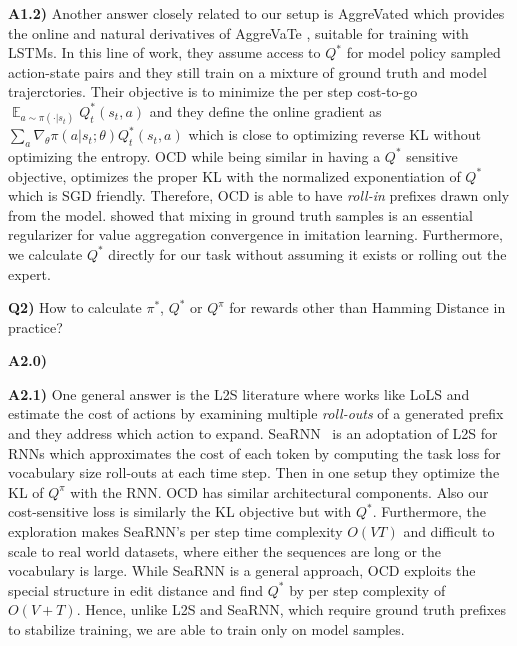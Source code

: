 {\textbf{A1.2)} Another answer closely related to our setup is AggreVated \citep{sun2017deeply} which provides the online and natural derivatives of AggreVaTe \citep{ross2014reinforcement}, suitable for training with LSTMs. In this line of work, they assume access to $Q^*$ for model policy sampled action-state pairs and they still train on a mixture of ground truth and model trajerctories. Their objective is to minimize the per step cost-to-go $\mathop{\mathbb{E}}_{a \sim \pi(\cdot | s_t)}Q_t^*(s_t,a)$ and they define the online gradient as $\sum_{a}\nabla_{\theta}\pi(a|s_t;\theta) Q_t^*(s_t, a)$ which is close to optimizing reverse KL without optimizing the entropy. OCD while being similar in having a  $Q^*$ sensitive objective, optimizes the proper KL with the normalized exponentiation of $Q^*$ which is SGD friendly. Therefore, OCD is able
to have {\em roll-in} prefixes drawn only from the model. \cite{cheng2018convergence} showed that
mixing in ground truth samples is an essential regularizer for value
aggregation convergence in imitation learning. Furthermore, we calculate $Q^*$ directly for our task without assuming it exists or rolling out the expert. 

\textbf{Q2)} How to calculate $\pi^*$, $Q^*$ or $Q^\pi$ for rewards other than Hamming Distance in practice?

\textbf{A2.0)} 

\textbf{A2.1)} One general answer is the L2S \citep{l2s2005}
literature where works like LoLS \citep{chang2015learning} and \cite{goodman2016noise}
estimate the cost of actions by examining
multiple {\em roll-outs} of a generated
prefix and they address which action to expand. SeaRNN~\citep{searnn2017} is an adoptation of L2S for RNNs which approximates the cost of
each token by computing the task loss for vocabulary size roll-outs
at each time step. Then in one setup they optimize the KL of $Q^\pi$ with the RNN. OCD has similar architectural components. Also our cost-sensitive loss is similarly the KL objective but with $Q^*$. Furthermore, the exploration makes SeaRNN's per step time complexity $O(VT)$ and difficult to scale to real world
datasets, where either the sequences are long or the
vocabulary is large. While SeaRNN is a general approach, OCD exploits the special structure in edit distance
and find $Q^*$ by per step complexity of $O(V+T)$. Hence, unlike L2S and SeaRNN, which require
ground truth prefixes to stabilize training, we are able to train only on model samples.

}
